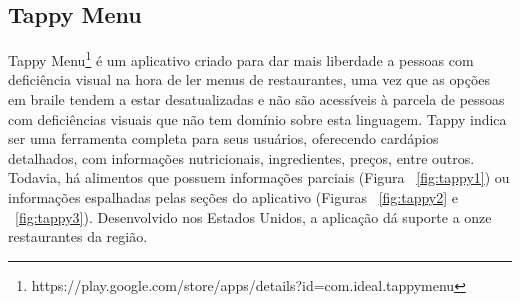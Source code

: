 \subsection{Tappy Menu}
Tappy Menu\footnote{https://play.google.com/store/apps/details?id=com.ideal.tappymenu} é um aplicativo criado para dar mais liberdade a pessoas com deficiência visual na hora de ler menus de restaurantes, uma vez que as opções em braile tendem a estar desatualizadas e não são acessíveis à parcela de pessoas com deficiências visuais que não tem domínio sobre esta linguagem. Tappy indica ser uma ferramenta completa para seus usuários, oferecendo cardápios detalhados, com informações nutricionais, ingredientes, preços, entre outros. Todavia, há alimentos que possuem informações parciais (Figura ~\ref{fig:tappy1}) ou informações espalhadas pelas seções do aplicativo (Figuras ~\ref{fig:tappy2} e ~\ref{fig:tappy3}). Desenvolvido nos Estados Unidos, a aplicação dá suporte a onze restaurantes da região.

